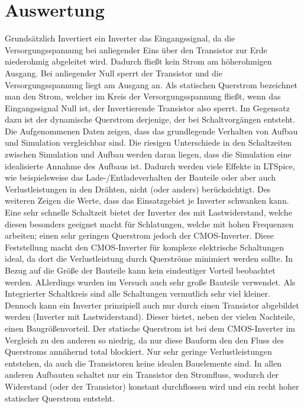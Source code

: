 \documentclass[11pt, a4paper]{article}
\begin{document}
\section*{Auswertung}
Grundsätzlich Invertiert ein Inverter das Eingangssignal, da die Versorgungsspannung bei anliegender Eins über den Transistor zur Erde niederohmig abgeleitet wird. Dadurch fließt kein Strom am höherohmigen Ausgang. Bei anliegender Null sperrt der Transistor und die Versorgungsspannung liegt am Ausgang an.
Als statischen Querstrom bezeichnet man den Strom, welcher im Kreis der Versorgungsspannung fließt, wenn das Eingangssignal Null ist, der Invertierende Transistor also sperrt. Im Gegensatz dazu ist der dynamische Querstrom derjenige, der bei Schaltvorgängen entsteht.
Die Aufgenommenen Daten zeigen, dass das grundlegende Verhalten von Aufbau und Simulation vergleichbar sind. Die riesigen Unterschiede in den Schaltzeiten zwischen Simulation und Aufbau werden daran liegen, dass die Simulation eine idealisierte Annahme des Aufbaus ist. Dadurch werden viele Effekte in LTSpice, wie beispielsweise das Lade-/Entladeverhalten der Bauteile oder aber auch Verlustleistungen in den Drähten, nicht (oder anders) berücksichtigt. Des weiteren Zeigen die Werte, dass das Einsatzgebiet je Inverter schwanken kann. Eine sehr schnelle Schaltzeit bietet der Inverter des mit Lastwiderstand, welche diesen besonders geeignet macht für Schlatungen, welche mit hohen Frequenzen arbeiten; einen sehr geringen Querstrom jedoch der CMOS-Inverter. Diese Feststellung macht den CMOS-Inverter für komplexe elektrische Schaltungen ideal, da dort die Verlustleistung durch Querströme minimiert werden sollte.
In Bezug auf die Größe der Bauteile kann kein eindeutiger Vorteil beobachtet werden. ALlerdings wurden im Versuch auch sehr große Bauteile verwendet. Als Integrierter Schaltkreis sind alle Schaltungen vermutlich sehr viel kleiner.
Dennoch kann ein Inverter prinzipiell auch nur durch einen Transistor abgebildet werden (Inverter mit Lastwiderstand). Dieser bietet, neben der vielen Nachteile, einen Baugrößenvorteil.
Der statische Querstrom ist bei dem CMOS-Inverter im Vergleich zu den anderen so niedrig, da nur diese Bauform den den Fluss des Querstroms annähernd total blockiert. Nur sehr geringe Verlustleistungen entstehen, da auch die Transistoren keine idealen Bauelemente sind. In allen anderen Aufbauten schaltet nur ein Transistor den Stromfluss, wodurch der Widerstand (oder der Transistor) konstant durchflossen wird und ein recht hoher statischer Querstrom entsteht.
\end{document}
